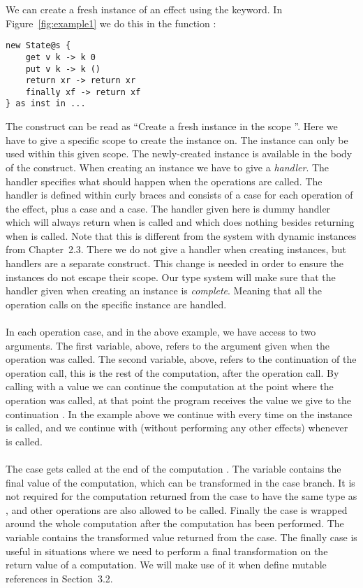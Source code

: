 We can create a fresh instance of an effect using the  keyword.
In Figure~\ref{fig:example1} we do this in the function :
\begin{verbatim}
new State@s {
	get v k -> k 0
	put v k -> k ()
	return xr -> return xr
	finally xf -> return xf
} as inst in ...
\end{verbatim}
The construct  can be read as ``Create a fresh  instance in the scope ''.
Here we have to give a specific scope  to create the instance on.
The instance can only be used within this given scope.
The newly-created instance is available in the body of the  construct.
When creating an instance we have to give a \emph{handler}.
The handler specifies what should happen when the operations are called.
The handler is defined within curly braces and consists of a case for each operation of the effect, plus a  case and a  case.
The handler given here is dummy handler which will always return  when  is called and which does nothing besides returning \ident{()} when  is called.
Note that this is different from the system with dynamic instances from Chapter~2.3.
There we do not give a handler when creating instances, but handlers are a separate construct.
This change is needed in order to ensure the instances do not escape their scope.
Our type system will make sure that the handler given when creating an instance is \emph{complete}.
Meaning that all the operation calls on the specific instance are handled.
\\\\
In each operation case,  and  in the above example, we have access to two arguments.
The first variable,  above, refers to the argument given when the operation was called.
The second variable,  above, refers to the continuation of the operation call, this is the rest of the computation, after the operation call.
By calling  with a value we can continue the computation at the point where the operation was called, at that point the program receives the value we give to the continuation .
In the example above we continue with  every time  on the instance  is called, and we continue with \ident{()} (without performing any other effects) whenever  is called.
\\\\
The  case gets called at the end of the computation .
The variable  contains the final value of the computation, which can be transformed in the case branch.
It is not required for the computation returned from the case to have the same type as , and other operations are also allowed to be called.
Finally the  case is wrapped around the whole computation  after the  computation has been performed.
The variable  contains the transformed value returned from the  case.
The finally case is useful in situations where we need to perform a final transformation on the return value of a computation.
We will make use of it when define mutable references in Section~3.2.


